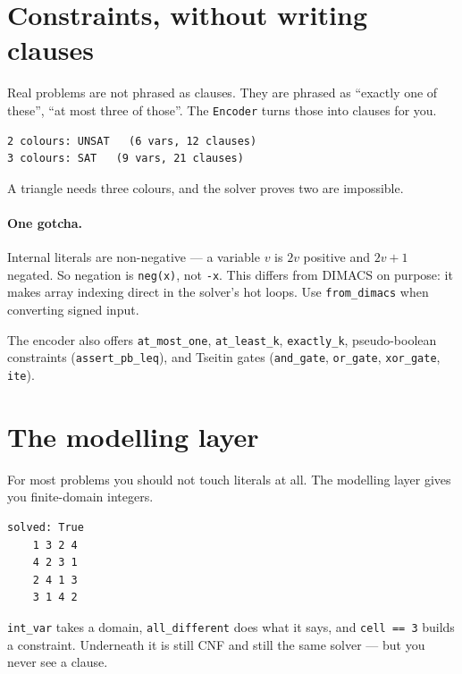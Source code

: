 \documentclass[11pt,a4paper]{article}
\begin{document}
\section{Constraints, without writing clauses}
\label{sec:encoder}

Real problems are not phrased as clauses. They are phrased as ``exactly one of
these'', ``at most three of those''. The \texttt{Encoder} turns those into
clauses for you.



\begin{lstlisting}[style=out]
2 colours: UNSAT   (6 vars, 12 clauses)
3 colours: SAT   (9 vars, 21 clauses)
\end{lstlisting}

A triangle needs three colours, and the solver proves two are impossible.

\paragraph{One gotcha.} Internal literals are non-negative --- a variable $v$
is $2v$ positive and $2v{+}1$ negated. So negation is \texttt{neg(x)}, not
\texttt{-x}. This differs from DIMACS on purpose: it makes array indexing
direct in the solver's hot loops. Use \texttt{from\_dimacs} when converting
signed input.

The encoder also offers \texttt{at\_most\_one}, \texttt{at\_least\_k},
\texttt{exactly\_k}, pseudo-boolean constraints
(\texttt{assert\_pb\_leq}), and Tseitin gates (\texttt{and\_gate},
\texttt{or\_gate}, \texttt{xor\_gate}, \texttt{ite}).

\section{The modelling layer}

For most problems you should not touch literals at all. The modelling layer
gives you finite-domain integers.



\begin{lstlisting}[style=out]
solved: True
    1 3 2 4
    4 2 3 1
    2 4 1 3
    3 1 4 2
\end{lstlisting}

\texttt{int\_var} takes a domain, \texttt{all\_different} does what it says,
and \texttt{cell == 3} builds a constraint. Underneath it is still CNF and
still the same solver --- but you never see a clause.
\end{document}
